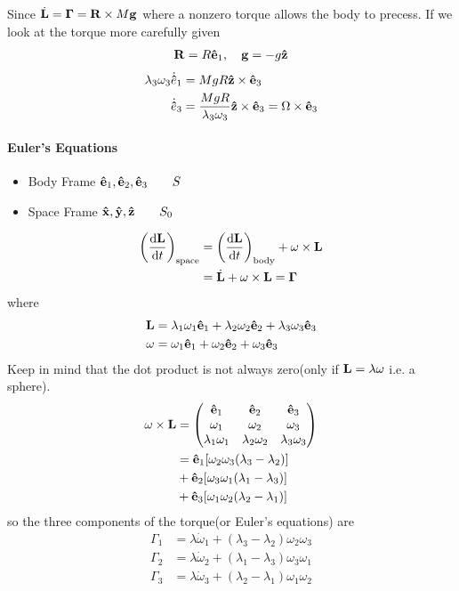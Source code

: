 \documentclass[../main.tex]{subfiles}
\begin{document}
Since $\dot{\vb L} = \vb \Gamma = \vb R \times M \vb g$ where a nonzero torque allows the body to 
precess. If we look at the torque more carefully given
\begin{align*}
    \vb R = R \vu  e_1, \quad \vb g = -g \vu z
\end{align*}
\begin{align*}
    \lambda_3 \omega_3 \dot{\vu e}_1 &= MgR \vu z \times \vu e_3 \\
    \dot{\vu e}_3 &= \frac{MgR}{\lambda_3 \omega_3} \vu z \times \vu e_3 = \Omega \times \vu e_3
\end{align*}
\paragraph*{Euler's Equations} 
\begin{itemize}
    \item Body Frame $\vu e_1, \vu e_2, \vu e_3 \qquad S$ 
    \item Space Frame $\vu x, \vu y, \vu z \qquad S_0$
\end{itemize}
\begin{align*}
    \qt(\dv{\vb L}{t})_{\text{space}} &= \qt(\dv{\vb L}{t})_{\text{body}} + \vb \omega \times \vb L \\
    &= \dot{\vb L} + \omega \times \vb L = \vb \Gamma
\end{align*}
where
\begin{align*}
    \vb L &= \lambda_1 \omega_1 \vu e_1 + \lambda_2 \omega_2 \vu e_2 + \lambda_3 \omega_3 \vu e_3 \\
    \vb \omega &= \omega_1 \vu e_1 + \omega_2 \vu e_2 + \omega_3 \vu e_3
\end{align*}
Keep in mind that the dot product is not always zero(only if $\vb L = \lambda \vb \omega$ i.e. a
sphere).
\begin{align*}
    \vb \omega \times \vb L &= 
    \mqty(\vu e_1 & \vu e_2 & \vu e_3 \\
         \omega_1 & \omega_2 & \omega_3 \\ 
        \lambda_1 \omega_1 & \lambda_2 \omega_2 & \lambda_3 \omega_3) \\
    &= \vu e_1 [\omega_2 \omega_3 (\lambda_3 - \lambda_2)] \\
    &+ \vu e_2 [\omega_3 \omega_1 (\lambda_1 - \lambda_3)] \\
    &+ \vu e_3 [\omega_1 \omega_2 (\lambda_2 - \lambda_1)]
\end{align*}
so the three components of the torque(or Euler's equations) are 
\begin{align*}
    \Gamma_1 &= \lambda \dot{\omega}_1 + (\lambda_3 - \lambda_2) \omega_2 \omega_3 \\
    \Gamma_2 &= \lambda \dot{\omega}_2 + (\lambda_1 - \lambda_3) \omega_3 \omega_1 \\
    \Gamma_3 &= \lambda \dot{\omega}_3 + (\lambda_2 - \lambda_1) \omega_1 \omega_2
\end{align*}
\end{document}
